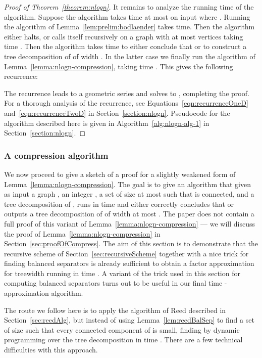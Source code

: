 \documentclass[a4paper,11pt]{article}
\theoremstyle{definition}
\theoremstyle{remark}
\begin{document}
\begin{proof}[Proof of Theorem~\ref{theorem:nlogn}]
  It remains to analyze the running time of the algorithm.  Suppose
  the algorithm takes time at most  on input  where
  .  Running the algorithm of
  Lemma~\ref{lem:prelim:bodlaender} takes  time.  Then
  the algorithm either halts, or calls itself recursively on a graph
  with at most  vertices
  taking time .  Then the algorithm takes
  time  to either conclude that  or to
  construct a tree decomposition  of  of width .
  In the latter case we finally run the algorithm of
  Lemma~\ref{lemma:nlogn-compression}, taking time .  This gives the following recurrence:
  
  The recurrence leads to a geometric series and solves to , completing the proof.  For a
  thorough analysis of the recurrence, see
  Equations~\ref{eqn:recurrenceOneD} and~\ref{eqn:recurrenceTwoD} in
  Section~\ref{section:nlogn}.  Pseudocode for the algorithm described
  here is given in Algorithm~\ref{alg:nlogn-alg-1} in
  Section~\ref{section:nlogn}.
\end{proof}

\subsubsection{A compression algorithm}\label{sec:firstCompress}
We now proceed to give a sketch of a proof for a slightly weakened
form of Lemma~\ref{lemma:nlogn-compression}.  The goal is to give an
algorithm that given as input a graph , an integer , a set 
of size at most  such that  is connected, and a
tree decomposition  of , runs in time 
and either correctly concludes that  or outputs a tree
decomposition of  of width at most .  The paper does not
contain a full proof of this variant of
Lemma~\ref{lemma:nlogn-compression} --- we will discuss the proof of
Lemma~\ref{lemma:nlogn-compression} in
Section~\ref{sec:proofOfCompress}.  The aim of this section is to
demonstrate that the recursive scheme of
Section~\ref{sec:recursiveScheme} together with a nice trick for
finding balanced separators is already sufficient to obtain a factor
 approximation for treewidth running in time .  A
variant of the trick used in this section for computing balanced
separators turns out to be useful in our final  time
-approximation algorithm.

The route we follow here
is to apply the algorithm of Reed described in
Section~\ref{sec:reedAlg}, but instead of using
Lemma~\ref{lem:reedBalSep} to find a set  of size  such that
every connected component of  is small, finding  by
dynamic programming over the tree decomposition  in time
.  There are a few technical difficulties with this approach.
\end{document}

